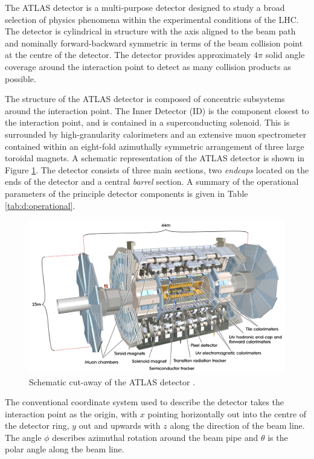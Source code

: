 	The ATLAS detector \cite{ATLAS} is a multi-purpose detector designed to study a broad selection of physics phenomena within the experimental conditions of the LHC. The detector is cylindrical in structure with the axis aligned to the beam path and nominally forward-backward symmetric in terms of the beam collision point at the centre of the detector. The detector provides approximately $4\pi$ solid angle coverage around the interaction point to detect as many collision products as possible.

	The structure of the ATLAS detector is composed of concentric subsystems around the interaction point.  The Inner Detector (ID) is the component closest to the interaction point, and is contained in a superconducting solenoid. This is surrounded by high-granularity calorimeters and an extensive muon spectrometer contained within an eight-fold azimuthally symmetric arrangement of three large toroidal magnets. A schematic representation of the ATLAS detector is shown in Figure \ref{fig:t:ATLAS}. 	The detector consists of three main sections, two \textit{endcaps} located on the ends of the detector and a central \textit{barrel} section. A summary of the operational parameters of the principle detector components is given in Table \ref{tab:d:operational}.

	\begin{figure}[h]
		\centering
		\includegraphics[width=0.7\linewidth]{D/FIGS/ATLAS_SE_Corrected7}
		\caption[Schematic cut-away of the ATLAS detector]{Schematic cut-away of the ATLAS detector \cite{ATLASSchem}.}
		\label{fig:t:ATLAS}
	\end{figure}

	The conventional coordinate system used to describe the detector takes the interaction point as the origin, with $x$ pointing horizontally out into the centre of the detector ring, $y$ out and upwards with $z$ along the direction of the beam line. The angle $\phi$ describes azimuthal rotation around the beam pipe and $\theta$ is the polar angle along the beam line.


